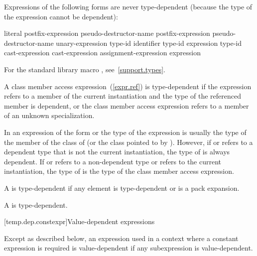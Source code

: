 \pnum
Expressions of the following forms are never type-dependent (because the type
of the expression cannot be dependent):

\begin{ncbnftab}
literal\br
postfix-expression  pseudo-destructor-name\br
postfix-expression \terminal{->} pseudo-destructor-name\br
{} unary-expression\br
{} type-id \terminal{)}\br
{}  \terminal{(} identifier \terminal{)}\br
{} type-id \terminal{)}\br
{} expression \terminal{)}\br
{} type-id \terminal{)}\br
{} cast-expression\br
{} cast-expression\br
{} assignment-expression\opt\br
{} \terminal{(} expression \terminal{)}
\end{ncbnftab}

\begin{note} For the standard library macro ,
see~\ref{support.types}.\end{note}

\pnum
A class member access expression~(\ref{expr.ref}) is
type-dependent if
the expression refers to a member of the current instantiation and
the type of the referenced member is dependent, or the class member access
expression refers to a member of an unknown specialization.
\begin{note}
In an expression of the form
or
the type of the expression is usually the type of the member
of the class of
(or the class pointed to by
).
However, if
or
refers to a dependent type that is not the current instantiation,
the type of
is always dependent. If
or 
refers to a non-dependent type or refers to the current instantiation, the
type of
is the type of the class member access expression.
\end{note}

\pnum
A  is type-dependent if any element is
type-dependent or is a pack expansion.

\pnum
A  is type-dependent.

[temp.dep.constexpr]{Value-dependent expressions}

\pnum
Except as described below, an expression used in a context where a
constant expression is required is value-dependent if any
subexpression is value-dependent.

